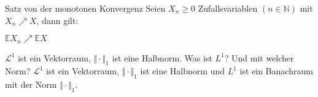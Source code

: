 \documentclass[avery5371,grid,frame]{flashcards} %
\newcommand{\1}{ \mathbb{1} } %
\begin{document}

\begin{flashcard}[Satz]{Satz von der monotonen Konvergenz}
  Seien $X_n\geq 0$ Zufallsvariablen $(n \in \mathbb{N})$ mit $X_n \nearrow X$,
  dann gilt:
  \begin{center}
    $\mathbb{E}X_n \nearrow \mathbb{E}X$
  \end{center}
\end{flashcard}

\begin{flashcard}[Satz]{  $\mathcal{L}^1$ ist ein Vektorraum, $\Vert \cdot \Vert_1$ ist eine Halbnorm. Was ist $L^1$? Und mit welcher Norm?}
  $\mathcal{L}^1$ ist ein Vektorraum, $\Vert \cdot \Vert_1$ ist eine Halbnorm und $L^1$ ist ein Banachraum mit der Norm $\Vert \cdot \Vert_1$.
\end{flashcard}
\end{document}
